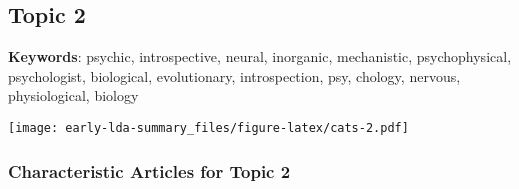 \documentclass[
]{article}
\begin{document}
\newpage

\hypertarget{topic-2}{%
\subsection{Topic 2}\label{topic-2}}

\textbf{Keywords}: psychic, introspective, neural, inorganic,
mechanistic, psychophysical, psychologist, biological, evolutionary,
introspection, psy, chology, nervous, physiological, biology

\texttt{[image: early-lda-summary\_files/figure-latex/cats-2.pdf]}
\newpage 

\hypertarget{characteristic-articles-for-topic-2}{%
\subsubsection{Characteristic Articles for Topic
2}\label{characteristic-articles-for-topic-2}}
\end{document}
